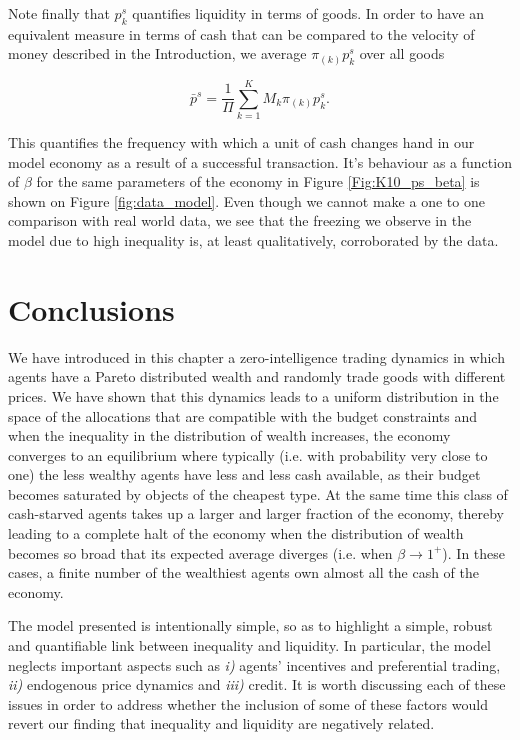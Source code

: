 Note finally that $p^s_k$ quantifies liquidity in terms of goods. In order to have an equivalent measure in terms of cash that can be compared to the velocity of money described in the Introduction, we average $\pi_{(k)} p^s_k$ over all goods

\begin{equation}
\label{def:pavg}
\bar p^s=\frac{1}{\Pi}\sum_{k=1}^K M_k \pi_{(k)} p^s_k.
\end{equation}

This quantifies the frequency with which a unit of cash changes hand in our model economy as a result of a successful transaction. It's behaviour as a function of $\beta$ for the same parameters of the economy in Figure \ref{Fig:K10_ps_beta} is shown on Figure \ref{fig:data_model}. Even though we cannot make a one to one comparison with real world data, we see that the freezing we observe in the model due to high inequality is, at least qualitatively, corroborated by the data.


\section{Conclusions}
\label{sec:con}

We have introduced in this chapter a zero-intelligence trading dynamics in which agents have a Pareto distributed wealth and randomly trade goods with different prices. We have shown that this dynamics leads to a uniform distribution in the space of the allocations that are compatible with the budget constraints and when the inequality in the distribution of wealth increases, the economy converges to an equilibrium where typically (i.e. with probability very close to one) the less wealthy agents have less and less cash available, as their budget becomes saturated by objects of the cheapest type. At the same time this class of cash-starved agents takes up a larger and larger fraction of the economy, thereby leading to a complete halt of the economy when the distribution of wealth becomes so broad that its expected average diverges (i.e. when $\beta \to 1^{+}$). In these cases, a finite number of the wealthiest agents own almost all the cash of the economy. 

The model presented is intentionally simple, so as to highlight a simple, robust and quantifiable link between inequality and liquidity. In particular, the model neglects important aspects such as {\em i)} agents' incentives and preferential trading, {\em ii)} endogenous price dynamics and {\em iii)} credit. It is worth discussing each of these issues in order to address whether the inclusion of some of these factors would revert our finding that inequality and liquidity are negatively related. 

